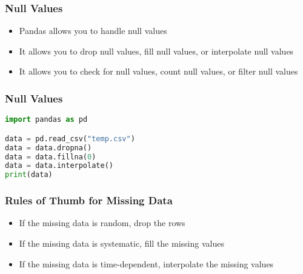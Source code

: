 \documentclass[serif, 9pt, aspectratio=32]{beamer}
\begin{document}
\begin{frame}
    \centering
    \frametitle{Null Values}
    \begin{itemize}
        \setlength{\itemsep}{2em}
        \item Pandas allows you to handle null values
        \item It allows you to drop null values, fill null values, or interpolate null values
        \item It allows you to check for null values, count null values, or filter null values
    \end{itemize}
\end{frame}

\begin{frame}[fragile]
    \frametitle{Null Values}
    \begin{lstlisting}[language=Python]
import pandas as pd

data = pd.read_csv("temp.csv")
data = data.dropna()
data = data.fillna(0)
data = data.interpolate()
print(data)
    \end{lstlisting}
\end{frame}

\begin{frame}
    \centering
    \frametitle{Rules of Thumb for Missing Data}
    \begin{itemize}
        \setlength{\itemsep}{2em}
        \item If the missing data is random, drop the rows
        \item If the missing data is systematic, fill the missing values
        \item If the missing data is time-dependent, interpolate the missing values
    \end{itemize}
\end{frame}
\end{document}
